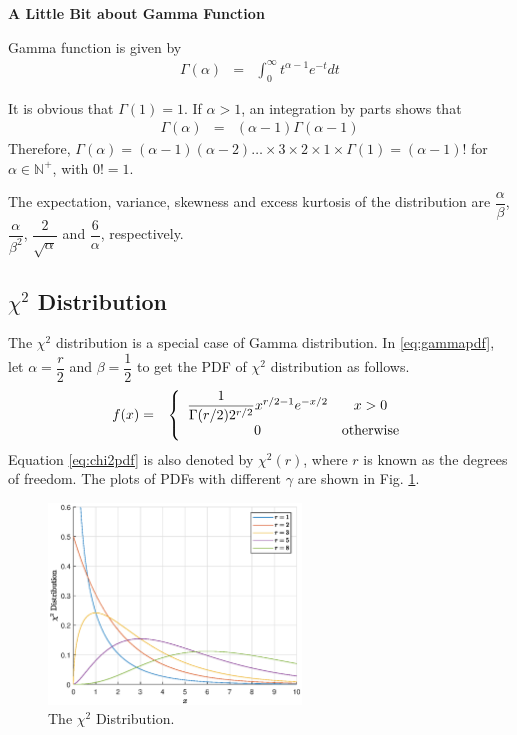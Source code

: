 \begin{mdframed}
	\noindent \textbf{A Little Bit about Gamma Function}
	
	Gamma function is given by
	\begin{eqnarray}
		\Gamma(\alpha) &=& \int_{0}^{\infty}t^{\alpha-1}e^{-t}dt \nonumber
	\end{eqnarray}
	
	It is obvious that $\Gamma(1)=1$. If $\alpha > 1$, an integration by parts shows that
	\begin{eqnarray}
		\Gamma(\alpha) &=& (\alpha-1)\Gamma(\alpha-1) \nonumber
	\end{eqnarray}
	Therefore, $\Gamma(\alpha)=(\alpha-1)(\alpha-2)\ldots \times 3 \times 2 \times 1 \times \Gamma(1) = (\alpha-1)!$ for $\alpha \in \mathbb{N}^+$, with $0!=1$.
	
\end{mdframed}

The expectation, variance, skewness and excess kurtosis of the distribution are $\dfrac{\alpha}{\beta}$, $\dfrac{\alpha}{\beta^2}$, $\dfrac{2}{\sqrt{\alpha}}$ and $\dfrac{6}{\alpha}$, respectively.

\subsection{$\chi^2$ Distribution}

The $\chi^2$ distribution is a special case of Gamma distribution. In \eqref{eq:gammapdf}, let $\alpha = \dfrac{r}{2}$ and $\beta=\dfrac{1}{2}$ to get the PDF of $\chi^2$ distribution as follows.
\begin{eqnarray}
	f(x) &=& \left\{\begin{array}{cc}
		\dfrac{1}{\Gamma(r/2)2^{r/2}}x^{r/2-1}e^{-x/2} & x > 0  \\
		0 & \textup{otherwise}
	\end{array}\right. \label{eq:chi2pdf}
\end{eqnarray}
Equation \eqref{eq:chi2pdf} is also denoted by $\chi^2(r)$, where $r$ is known as the degrees of freedom. The plots of PDFs with different $\gamma$ are shown in Fig. \ref{fig:chi2_pdf}.
\begin{figure}[!htb]
	\centering
	\includegraphics[width=0.6\textwidth]{chapters/part-1/figures/chi2_pdf.eps}
	\caption{The $\chi^2$ Distribution.} \label{fig:chi2_pdf}
\end{figure}

